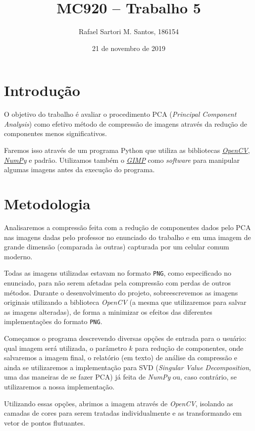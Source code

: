 \documentclass[brazilian,a4paper,twocolumn]{article}
\title{MC920 -- Trabalho 5}
\author{Rafael Sartori M. Santos, 186154}
\date{21 de novembro de 2019}
\begin{document}
\maketitle


\section{Introdução}

    O objetivo do trabalho é avaliar o procedimento PCA (\textit{Principal Component Analysis}) como efetivo método de compressão de imagens através da redução de componentes menos significativos.

    Faremos isso através de um programa Python que utiliza as bibliotecas \href{https://opencv.org/}{\emph{OpenCV}}, \href{https://numpy.org/}{\emph{NumPy}} e padrão. Utilizamos também o \href{https://www.gimp.org/}{\emph{GIMP}} como \textit{software} para manipular algumas imagens antes da execução do programa.


\section{Metodologia}

    Analisaremos a compressão feita com a redução de componentes dados pelo PCA nas imagens dadas pelo professor no enunciado do trabalho e em uma imagem de grande dimensão (comparada às outras) capturada por um celular comum moderno.

    Todas as imagens utilizadas estavam no formato \texttt{PNG}, como especificado no enunciado, para não serem afetadas pela compressão com perdas de outros métodos. Durante o desenvolvimento do projeto, sobreescrevemos as imagens originais utilizando a biblioteca \emph{OpenCV} (a mesma que utilizaremos para salvar as imagens alteradas), de forma a minimizar os efeitos das diferentes implementações do formato \texttt{PNG}.

    Começamos o programa descrevendo diversas opções de entrada para o usuário: qual imagem será utilizada, o parâmetro $k$ para redução de componentes, onde salvaremos a imagem final, o relatório (em texto) de análise da compressão e ainda se utilizaremos a implementação para SVD (\textit{Singular Value Decomposition}, uma das maneiras de se fazer PCA) já feita de \emph{NumPy} ou, caso contrário, se utilizaremos a nossa implementação.

    Utilizando essas opções, abrimos a imagem através de \emph{OpenCV}, isolando as camadas de cores para serem tratadas individualmente e as transformando em vetor de pontos flutuantes.
\end{document}
